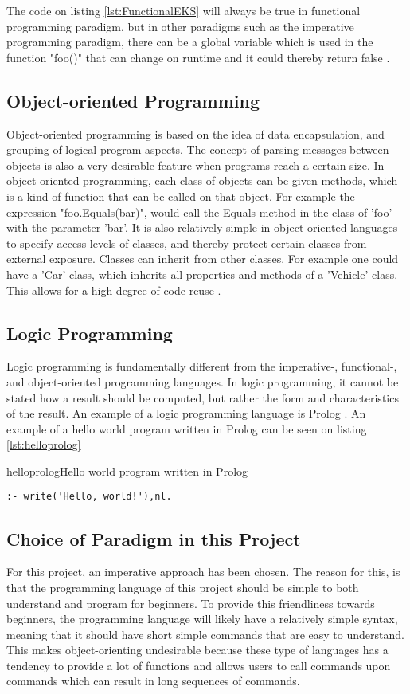 The code on listing \ref{lst:FunctionalEKS} will always be true in functional programming paradigm, but in other paradigms such as the imperative programming paradigm, there can be a global variable which is used in the function "foo()" that can change on runtime and it could thereby return false \citep{ProgrammingParadigms}.
\subsection{Object-oriented Programming}
Object-oriented programming is based on the idea of data encapsulation, and grouping of logical program aspects. The concept of parsing messages between objects is also a very desirable feature when programs reach a certain size. In object-oriented programming, each class of objects can be given methods, which is a kind of function that can be called on that object. For example the expression "foo.Equals(bar)", would call the Equals-method in the class of 'foo' with the parameter 'bar'. It is also relatively simple in object-oriented languages to specify access-levels of classes, and thereby protect certain classes from external exposure. Classes can inherit from other classes. For example one could have a 'Car'-class, which inherits all properties and methods of a 'Vehicle'-class. This allows for a high degree of code-reuse \citep{ProgrammingParadigms}.

\subsection{Logic Programming}
Logic programming is fundamentally different from the imperative-, functional-, and object-oriented programming languages. In logic programming, it cannot be stated how a result should be computed, but rather the form and characteristics of the result. An example of a logic programming language is Prolog  \citep{ProgrammingParadigms}. An example of a hello world program written in Prolog can be seen on listing \ref{lst:helloprolog}

\begin{code}{helloprolog}{Hello world program written in Prolog}
\begin{lstlisting}
:- write('Hello, world!'),nl.
\end{lstlisting}
\end{code}

\subsection{Choice of Paradigm in this Project}
For this project, an imperative approach has been chosen. The reason for this, is that the programming language of this project should be simple to both understand and program for beginners. To provide this friendliness towards beginners, the programming language will likely have a relatively simple syntax, meaning that it should have short simple commands that are easy to understand. This makes object-orienting undesirable because these type of languages has a tendency to provide a lot of functions and allows users to call commands upon commands which can result in long sequences of commands.